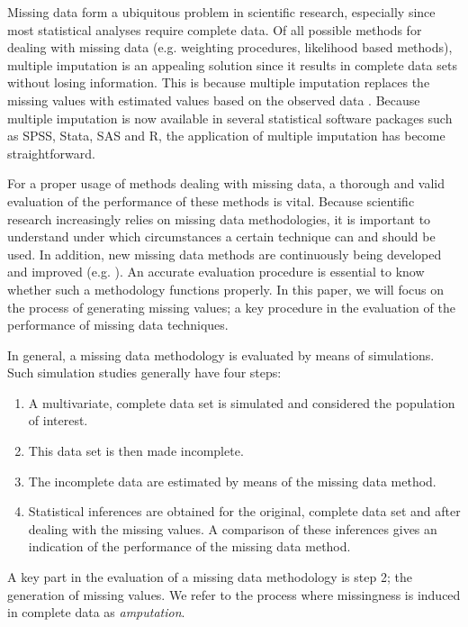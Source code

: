 \documentclass[]{interact}
\begin{document}
Missing data form a ubiquitous problem in scientific research, especially since most statistical analyses require complete data. Of all possible methods for dealing with missing data (e.g. weighting procedures, likelihood based methods), multiple imputation is an appealing solution since it results in complete data sets without losing information. This is because multiple imputation replaces the missing values with estimated values based on the observed data \citep{Rubin1987, Rubin1996, Stef2012}. Because multiple imputation is now available in several statistical software packages such as SPSS, Stata, SAS and R, the application of multiple imputation has become straightforward. 

For a proper usage of methods dealing with missing data, a thorough and valid evaluation of the performance of these methods is vital. Because scientific research increasingly relies on missing data methodologies, it is important to understand under which circumstances a certain technique can and should be used. In addition, new missing data methods are continuously being developed and improved (e.g. \citep{Vink2013, Fang2016, Kombo2016}). An accurate evaluation procedure is essential to know whether such a methodology functions properly. In this paper, we will focus on the process of generating missing values; a key procedure in the evaluation of the performance of missing data techniques. 

In general, a missing data methodology is evaluated by means of simulations. Such simulation studies generally have four steps: 

\begin{enumerate} 
\item A multivariate, complete data set is simulated and considered the population of interest. 
\item This data set is then made incomplete. 
\item The incomplete data are estimated by means of the missing data method. 
\item Statistical inferences are obtained for the original, complete data set and after dealing with the missing values. A comparison of these inferences gives an indication of the performance of the missing data method. 
\end{enumerate}

\noindent A key part in the evaluation of a missing data methodology is step 2; the generation of missing values. We refer to the process where missingness is induced in complete data as \textit{amputation}. 
\end{document}
